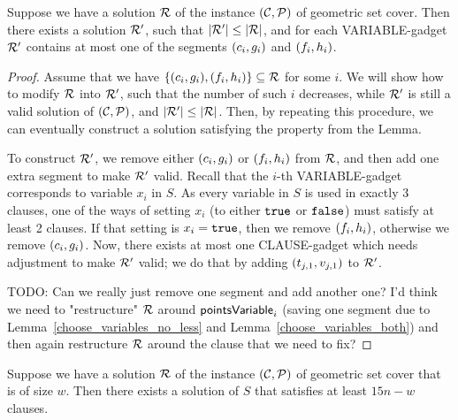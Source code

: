 \begin{lemma}
	\label{at_most_one_var_segment}
	Suppose we have a solution $\mathcal{R}$ of the instance $(\mathcal{C}, \mathcal{P})$
	of geometric set cover.
	Then there exists a solution $\mathcal{R}'$, such that $|\mathcal{R}'| \le |\mathcal{R}|$, and for each VARIABLE-gadget $\mathcal{R}'$ contains at most one of the segments $(c_{i}, g_{i})$ and $(f_{i}, h_{i})$.
\end{lemma}
\begin{proof}\leavevmode
Assume that we have $\{(c_{i}, g_{i}), (f_{i}, h_{i})\} \subseteq \mathcal{R}$ for some $i$. We will show how to modify $\mathcal{R}$ into $\mathcal{R}'$, such that the number of such $i$ decreases, while $\mathcal{R}'$ is still a valid solution of $(\mathcal{C}, \mathcal{P})$, and $|\mathcal{R}'| \le |\mathcal{R}|$. Then, by repeating this procedure, we can eventually construct a solution satisfying the property from the Lemma.

To construct $\mathcal{R}'$, we remove either $(c_{i}, g_{i})$ or $(f_{i}, h_{i})$ from $\mathcal{R}$, and then add one extra segment to make $\mathcal{R}'$ valid. Recall that the $i$-th VARIABLE-gadget corresponds to variable $x_i$ in $S$. As every variable in $S$ is used in exactly 3 clauses, one of the ways of setting $x_i$ (to either $\texttt{true}$ or $\texttt{false}$) must satisfy at least 2 clauses. If that setting is $x_i = \texttt{true}$, then we remove $(f_{i}, h_{i})$, otherwise we remove $(c_{i}, g_{i})$. Now, there exists at most one CLAUSE-gadget which needs adjustment to make $\mathcal{R}'$ valid; we do that by adding $(t_{j, 1}, v_{j, 1})$ to $\mathcal{R}'$.

TODO: Can we really just remove one segment and add another one? I'd think we need to "restructure" $\mathcal{R}$ around $\mathsf{pointsVariable}_{i}$ (saving one segment due to Lemma~\ref{choose_variables_no_less} and Lemma~\ref{choose_variables_both}) and then again restructure $\mathcal{R}$ around the clause that we need to fix?
\end{proof}

\begin{lemma}
	\label{construction_completness}
	Suppose we have a solution $\mathcal{R}$ of the instance $(\mathcal{C}, \mathcal{P})$
	of geometric set cover that is of size $w$.
	Then there exists a solution of $S$
	that satisfies at least $15n - w$ clauses.
\end{lemma}


